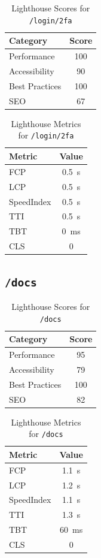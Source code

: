 \begin{table}[H]
  \centering
  \caption{Lighthouse Scores for \texttt{/login/2fa}}
  \begin{tabular}{|l|c|}
    \hline
    Category & Score \\ \hline
    Performance & 100 \\ \hline
    Accessibility & 90 \\ \hline
    Best Practices & 100 \\ \hline
    SEO & 67 \\ \hline
  \end{tabular}
\end{table}

\begin{table}[H]
  \centering
  \caption{Lighthouse Metrics for \texttt{/login/2fa}}
  \begin{tabular}{|l|c|}
    \hline
    Metric & Value \\ \hline
    FCP & 0.5 s \\ \hline
    LCP & 0.5 s \\ \hline
    SpeedIndex & 0.5 s \\ \hline
    TTI & 0.5 s \\ \hline
    TBT & 0 ms \\ \hline
    CLS & 0 \\ \hline
  \end{tabular}
\end{table}
\subsection{\texttt{/docs}}

\begin{table}[H]
  \centering
  \caption{Lighthouse Scores for \texttt{/docs}}
  \begin{tabular}{|l|c|}
    \hline
    Category & Score \\ \hline
    Performance & 95 \\ \hline
    Accessibility & 79 \\ \hline
    Best Practices & 100 \\ \hline
    SEO & 82 \\ \hline
  \end{tabular}
\end{table}

\begin{table}[H]
  \centering
  \caption{Lighthouse Metrics for \texttt{/docs}}
  \begin{tabular}{|l|c|}
    \hline
    Metric & Value \\ \hline
    FCP & 1.1 s \\ \hline
    LCP & 1.2 s \\ \hline
    SpeedIndex & 1.1 s \\ \hline
    TTI & 1.3 s \\ \hline
    TBT & 60 ms \\ \hline
    CLS & 0 \\ \hline
  \end{tabular}
\end{table}
